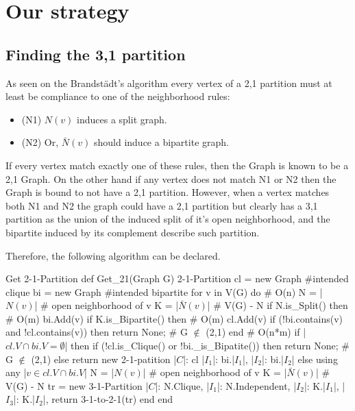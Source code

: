 \chapter{Our strategy}\label{ch:os}


\section{Finding the 3,1 partition}\label{sec:3,1-partition}

As seen on the Brandstädt's algorithm every vertex of a 2,1 partition must at least be compliance to one of the neighborhood rules:

\begin{itemize}
  \item (N1) $N(v)$ induces a split graph.
  \item (N2) Or, $\bar{N}(v)$ should induce a bipartite graph.
\end{itemize}

If every vertex match exactly one of these rules, then the Graph is known to be a 2,1 Graph.
On the other hand if any vertex does not match N1 or N2 then the Graph is bound to not have a 2,1 partition.
However, when a vertex matches both N1 and N2 the graph could have a 2,1 partition but clearly has a 3,1 partition as the union of the induced split of it's open neighborhood, and the bipartite induced by its complement describe such partition.

Therefore, the following algorithm can be declared.
\begin{code}{Get 2-1-Partition}
def Get_21(Graph G) 2-1-Partition
  cl = new Graph #intended clique
  bi = new Graph #intended bipartite 
  for v in V(G) do # O(n)
      N = |$N(v)$| # open neighborhood of v
      K = |$\bar{N}(v)$| # V(G) - N
      if N.is_Split() then # O(m)
        bi.Add(v)
      if K.is_Bipartite() then # O(m)
        cl.Add(v)
      if (!bi.contains(v) and !cl.contains(v)) then
       return None; # G $\notin$ (2,1)
  end # O(n*m)
  if |$cl.V \cap bi.V = \emptyset$| then
    if (!cl.is_Clique() or !bi._is_Bipatite()) then
      return None; # G $\notin$ (2,1)
    else return new 2-1-patition{
      |$C$|: cl
      |$I_1$|: bi.|$I_1$|,
      |$I_2$|: bi.|$I_2$|
    }
  else 
    using any |$v \in cl.V \cap bi.V$|
    N = |$N(v)$| # open neighborhood of v
    K = |$\bar{N}(v)$| # V(G) - N
    tr = new 3-1-Partition{
          |$C$|: N.Clique,
          |$I_1$|: N.Independent,
          |$I_2$|: K.|$I_1$|,
          |$I_3$|: K.|$I_2$|,
    }
    return 3-1-to-2-1(tr)
  end
end
\end{code}

